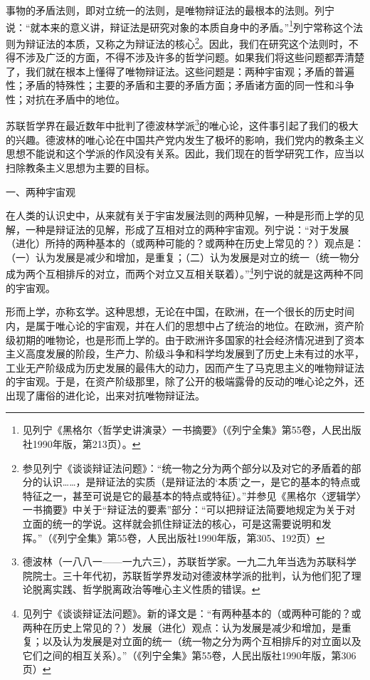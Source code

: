 \documentclass[UTF8, 12pt, a4paper]{ctexrep}
\begin{document}
事物的矛盾法则，即对立统一的法则，是唯物辩证法的最根本的法则。列宁说：“就本来的意义讲，辩证法是研究对象的本质自身中的矛盾。”\footnote{见列宁《黑格尔〈哲学史讲演录〉一书摘要》（《列宁全集》第55卷，人民出版社1990年版，第213页）。}列宁常称这个法则为辩证法的本质，又称之为辩证法的核心\footnote{参见列宁《谈谈辩证法问题》：“统一物之分为两个部分以及对它的矛盾着的部分的认识……，是辩证法的实质（是辩证法的‘本质’之一，是它的基本的特点或特征之一，甚至可说是它的最基本的特点或特征）。”并参见《黑格尔〈逻辑学〉一书摘要》中关于“辩证法的要素”部分：“可以把辩证法简要地规定为关于对立面的统一的学说。这样就会抓住辩证法的核心，可是这需要说明和发挥。”（《列宁全集》第55卷，人民出版社1990年版，第305、192页）}。因此，我们在研究这个法则时，不得不涉及广泛的方面，不得不涉及许多的哲学问题。如果我们将这些问题都弄清楚了，我们就在根本上懂得了唯物辩证法。这些问题是：两种宇宙观；矛盾的普遍性；矛盾的特殊性；主要的矛盾和主要的矛盾方面；矛盾诸方面的同一性和斗争性；对抗在矛盾中的地位。

苏联哲学界在最近数年中批判了德波林学派\footnote{德波林（一八八一——一九六三），苏联哲学家。一九二九年当选为苏联科学院院士。三十年代初，苏联哲学界发动对德波林学派的批判，认为他们犯了理论脱离实践、哲学脱离政治等唯心主义性质的错误。}的唯心论，这件事引起了我们的极大的兴趣。德波林的唯心论在中国共产党内发生了极坏的影响，我们党内的教条主义思想不能说和这个学派的作风没有关系。因此，我们现在的哲学研究工作，应当以扫除教条主义思想为主要的目标。

一、两种宇宙观

在人类的认识史中，从来就有关于宇宙发展法则的两种见解，一种是形而上学的见解，一种是辩证法的见解，形成了互相对立的两种宇宙观。列宁说：“对于发展（进化）所持的两种基本的（或两种可能的？或两种在历史上常见的？）观点是：（一）认为发展是减少和增加，是重复；（二）认为发展是对立的统一（统一物分成为两个互相排斥的对立，而两个对立又互相关联着）。”\footnote{见列宁《谈谈辩证法问题》。新的译文是：“有两种基本的（或两种可能的？或两种在历史上常见的？）发展（进化）观点：认为发展是减少和增加，是重复；以及认为发展是对立面的统一（统一物之分为两个互相排斥的对立面以及它们之间的相互关系）。”（《列宁全集》第55卷，人民出版社1990年版，第306页）}列宁说的就是这两种不同的宇宙观。

形而上学，亦称玄学。这种思想，无论在中国，在欧洲，在一个很长的历史时间内，是属于唯心论的宇宙观，并在人们的思想中占了统治的地位。在欧洲，资产阶级初期的唯物论，也是形而上学的。由于欧洲许多国家的社会经济情况进到了资本主义高度发展的阶段，生产力、阶级斗争和科学均发展到了历史上未有过的水平，工业无产阶级成为历史发展的最伟大的动力，因而产生了马克思主义的唯物辩证法的宇宙观。于是，在资产阶级那里，除了公开的极端露骨的反动的唯心论之外，还出现了庸俗的进化论，出来对抗唯物辩证法。
\end{document}
